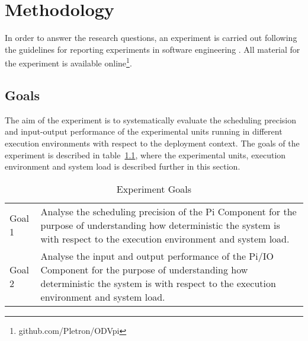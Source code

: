 \iffalse  \fi
\chapter{Methodology}

In order to answer the research questions, an experiment is carried out following the guidelines for reporting experiments in software engineering \cite{Andreas}. All material for the experiment is available online\footnote{github.com/Pletron/ODVpi}. 


\section{Goals}
The aim of the experiment is to systematically evaluate the scheduling precision and input-output performance of the experimental units running in different execution environments with respect to the deployment context. The goals of the experiment is described in table~\ref{table:exp-goals}, where the experimental units, execution environment and system load is described further in this section.  


\begin{table}[ht]
\begin{tabular}{l|p{12cm}}
Goal 1 & Analyse the scheduling precision of the Pi Component for the purpose of understanding how deterministic the system is with respect to the execution environment and system load. \\
Goal 2 & Analyse the input and output performance of the Pi/IO Component for the purpose of understanding how deterministic the system is with respect to the execution environment and system load.
\end{tabular}
\centering
\caption{Experiment Goals}
\label{table:exp-goals}
\end{table}


